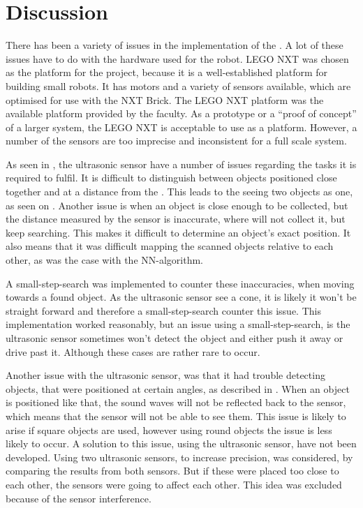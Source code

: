 \section{Discussion} \label{sec:discussion}

There has been a variety of issues in the implementation of the \projname{}. A lot of these issues have to do with the hardware used for the robot. LEGO NXT was chosen as the platform for the project, because it is a well-established platform for building small robots. It has motors and a variety of sensors available, which are optimised for use with the NXT Brick. The LEGO NXT platform was the available platform provided by the faculty. As a prototype or a ``proof of concept'' of a larger system, the LEGO NXT is acceptable to use as a platform. However, a number of the sensors are too imprecise and inconsistent for a full scale system.

As seen in , the ultrasonic sensor have a number of issues regarding the tasks it is required to fulfil. It is difficult to distinguish between objects positioned close together and at a distance from the \projname{}. This leads to the \projname{} seeing two objects as one, as seen on . Another issue is when an object is close enough to be collected, but the distance measured by the sensor is inaccurate, where \projname{} will not collect it, but keep searching. This makes it difficult to determine an object's exact position. It also means that it was difficult mapping the scanned objects relative to each other, as was the case with the NN-algorithm.

A small-step-search was implemented to counter these inaccuracies, when moving towards a found object. As the ultrasonic sensor see a cone, it is likely it won't be straight forward and therefore a small-step-search counter this issue.
This implementation worked reasonably, but an issue using a small-step-search, is the ultrasonic sensor sometimes won't detect the object and either push it away or drive past it. Although these cases are rather rare to occur.

Another issue with the ultrasonic sensor, was that it had trouble detecting objects, that were positioned at certain angles, as described in . When an object is positioned like that, the sound waves will not be reflected back to the sensor, which means that the sensor will not be able to see them. This issue is likely to arise if square objects are used, however using round objects the issue is less likely to occur. A solution to this issue, using the ultrasonic sensor, have not been developed. Using two ultrasonic sensors, to increase precision, was considered, by comparing the results from both sensors. But if these were placed too close to each other, the sensors were going to affect each other. This idea was excluded because of the sensor interference.

